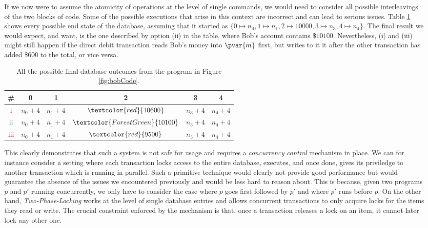 If we now were to assume the atomicity of operations at the level of single commands, we would need to consider all possible interleavings of the two blocks of code. Some of the possible executions that arise in this context are incorrect and can lead to serious issues. Table \ref{table:bankOutcome} shows every possible end state of the database, assuming that it started as $\{ 0 \mapsto n_0, 1 \mapsto n_1, 2 \mapsto 10000, 3 \mapsto n_3, 4 \mapsto n_4 \}$. The final result we would expect, and want, is the one described by option (ii) in the table, where Bob's account contains \$$10100$. Nevertheless, (i) and (iii) might still happen if the direct debit transaction reads Bob's money into $\pvar{m}$ first, but writes to it it after the other transaction has added \$$600$ to the total, or vice versa.

\bgroup
\setlength{\tabcolsep}{1em}
\def\arraystretch{1.5}
\begin{table}[h]
	\centering
	\caption{All the possible final database outcomes from the program in Figure \ref{fig:bobCode}.}
	\label{table:bankOutcome}
	\begin{tabular}{|c|c|c|c|c|c|}
	\hline
	\textbf{\#} & \textbf{0}         & \textbf{1}         & \textbf{2}         & \textbf{3}         & \textbf{4}         \\ \hline
	\textcolor{red}{i}   & $n_0 + 4$ & $n_1 + 4$ & $\textcolor{red}{10600}$     & $n_3 + 4$ & $n_4 + 4$ \\ \hline
	\textcolor{ForestGreen}{ii}  & $n_0 + 4$ & $n_1 + 4$ & $\textcolor{ForestGreen}{10100}$ & $n_3 + 4$ & $n_4 + 4$ \\ \hline
	\textcolor{red}{iii} & $n_0 + 4$ & $n_1 + 4$ & $\textcolor{red}{9500}$  & $n_3 + 4$ & $n_4 + 4$ \\ \hline
	\end{tabular}
\end{table}
\egroup

This clearly demonstrates that such a system is not safe for usage and requires a \textit{concurrency control} mechanism in place. We can for instance consider a setting where each transaction locks access to the entire database, executes, and once done, gives its priviledge to another transaction which is running in parallel. Such a primitive technique would clearly not provide good performance but would guarantee the absence of the issues we encountered previously and would be less hard to reason about. This is because, given two programs $p$ and $p'$ running concurrently, we only have to consider the case where $p$ goes first followed by $p'$ and where $p'$ runs before $p$. On the other hand, \textit{Two-Phase-Locking} works at the level of single database entries and allows concurrent transactions to only acquire locks for the items they read or write. The crucial constraint enforced by the mechanism is that, once a transaction releases a lock on an item, it cannot later lock any other one. 

